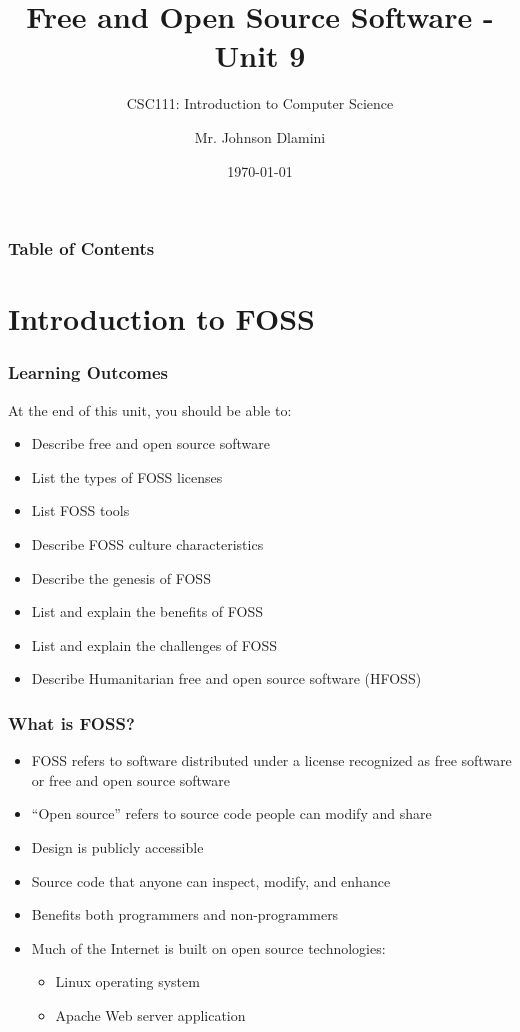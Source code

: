 \documentclass[aspectratio=169]{beamer}
\title[University of Eswatini]{Free and Open Source Software - Unit 9}
\subtitle{CSC111: Introduction to Computer Science}
\author[J.S.D]{Mr. Johnson Dlamini}
\institute[jsdlamini@uniswa.sz]{The University of Eswatini}
\date{\today}
\begin{document}
\frame{\titlepage}

\begin{frame}
\frametitle{Table of Contents}
\tableofcontents
\end{frame}

\section{Introduction to FOSS}

\begin{frame}
\frametitle{Learning Outcomes}
At the end of this unit, you should be able to:
\begin{itemize}
\item Describe free and open source software
\item List the types of FOSS licenses
\item List FOSS tools
\item Describe FOSS culture characteristics
\item Describe the genesis of FOSS
\item List and explain the benefits of FOSS
\item List and explain the challenges of FOSS
\item Describe Humanitarian free and open source software (HFOSS)
\end{itemize}
\end{frame}

\begin{frame}
\frametitle{What is FOSS?}
\begin{itemize}
\item FOSS refers to software distributed under a license recognized as free software or free and open source software
\item ``Open source'' refers to source code people can modify and share
\item Design is publicly accessible
\item Source code that anyone can inspect, modify, and enhance
\item Benefits both programmers and non-programmers
\item Much of the Internet is built on open source technologies:
    \begin{itemize}
    \item Linux operating system
    \item Apache Web server application
    \end{itemize}
\end{itemize}
\end{frame}
\end{document}

